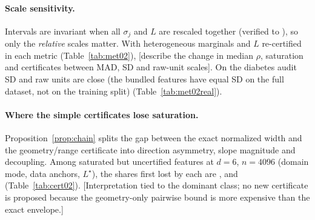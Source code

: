 \paragraph{Scale sensitivity.}
Intervals are invariant when all $\sigma_j$ and $L$ are rescaled together (verified to ),
so only the \emph{relative} scales matter. With heterogeneous marginals and $L$ re-certified in each metric
(Table~\ref{tab:met02}), [describe the change in median $\rho$, saturation and certificates between MAD, SD and raw-unit
scales]. On the diabetes audit SD and raw units are close (the bundled features have equal SD on the full dataset, not on
the training split) (Table~\ref{tab:met02real}).

\paragraph{Where the simple certificates lose saturation.}
Proposition~\ref{prop:chain} splits the gap between the exact normalized width and the geometry/range certificate into
direction asymmetry, slope magnitude and decoupling. Among saturated but uncertified features at $d=6$, $n=4096$
(domain mode, data anchors, $L^\star$), the shares first lost by each are ,
 and  (Table~\ref{tab:cert02}).
[Interpretation tied to the dominant class; no new certificate is proposed because the geometry-only pairwise bound is
more expensive than the exact envelope.]
